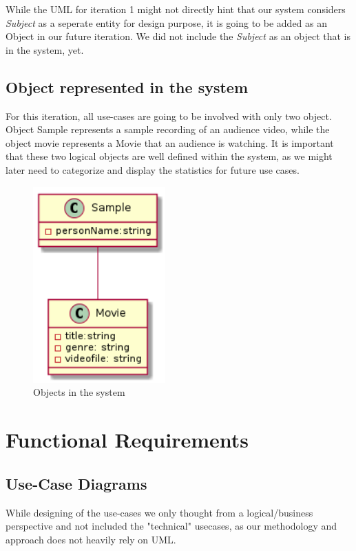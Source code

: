 \documentclass[12pt,a4paper,man]{report}
\begin{document}
While the UML for iteration 1 might not directly hint that our system considers \emph{Subject} as a seperate entity for design purpose, it is going to be added as an Object in our future iteration. We did not include the \emph{Subject} as an object that is in the system, yet. 


\section{Object represented in the system}
\label{sec:org1874f50}
For this iteration, all use-cases are going to be involved with only two object. Object Sample represents a sample recording of an audience video, while the object movie represents a Movie that an audience is watching. It is important that these two logical objects are well defined within the system, as we might later need to categorize and display the statistics for future use cases.
\begin{figure}[htbp]
\centering
\includegraphics[width=2in]{./img/obj1.png}
\caption{\label{fig:gantt1}
Objects in the system}
\end{figure}


\chapter{Functional Requirements}
\label{sec:orgf5acfc9}
\section{Use-Case Diagrams}
\label{sec:orgb2ca846}
While designing of the use-cases we only thought from a logical/business perspective and not included the "technical" usecases, as our methodology and approach does not heavily rely on UML. 
\end{document}
